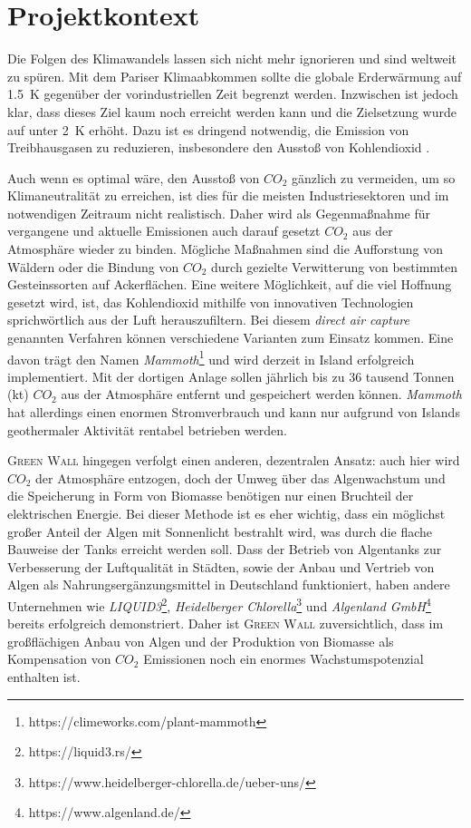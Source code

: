 \section{Projektkontext}

Die Folgen des Klimawandels lassen sich nicht mehr ignorieren und sind weltweit zu spüren. Mit dem Pariser Klimaabkommen sollte die globale Erderwärmung auf \qty{1,5}{\kelvin} gegenüber der vorindustriellen Zeit begrenzt werden. Inzwischen ist jedoch klar, dass dieses Ziel kaum noch erreicht werden kann und die Zielsetzung wurde auf unter \qty{2}{\kelvin} erhöht. Dazu ist es dringend notwendig, die Emission von Treibhausgasen zu reduzieren, insbesondere den Ausstoß von Kohlendioxid \cite{Online2024.UebereinkommenVonParis}.

Auch wenn es optimal wäre, den Ausstoß von \(CO_2\) gänzlich zu vermeiden, um so Klimaneutralität zu erreichen, ist dies für die meisten Industriesektoren und im notwendigen Zeitraum nicht realistisch.
Daher wird als Gegenmaßnahme für vergangene und aktuelle Emissionen auch darauf gesetzt \(CO_2\) aus der Atmosphäre wieder zu binden.
Mögliche Maßnahmen sind die Aufforstung von Wäldern oder die Bindung von \(CO_2\) durch gezielte Verwitterung von bestimmten Gesteinssorten auf Ackerflächen.
Eine weitere Möglichkeit, auf die viel Hoffnung gesetzt wird, ist, das Kohlendioxid mithilfe von innovativen Technologien sprichwörtlich aus der Luft herauszufiltern.
Bei diesem \textit{direct air capture} genannten Verfahren können verschiedene Varianten zum Einsatz kommen.
Eine davon trägt den Namen \textit{Mammoth}\footnote{https://climeworks.com/plant-mammoth} und wird derzeit in Island erfolgreich implementiert.
Mit der dortigen Anlage sollen jährlich bis zu 36 tausend Tonnen (\unit{\kilo\tonne}) \(CO_2\) aus der Atmosphäre entfernt und gespeichert werden können.
\textit{Mammoth} hat allerdings einen enormen Stromverbrauch und kann nur aufgrund von Islands geothermaler Aktivität rentabel betrieben werden.

\textsc{Green Wall} hingegen verfolgt einen anderen, dezentralen Ansatz: auch hier wird \(CO_2\) der Atmosphäre entzogen, doch der Umweg über das Algenwachstum und die Speicherung in Form von Biomasse benötigen nur einen Bruchteil der elektrischen Energie.
Bei dieser Methode ist es eher wichtig, dass ein möglichst großer Anteil der Algen mit Sonnenlicht bestrahlt wird, was durch die flache Bauweise der Tanks erreicht werden soll.
Dass der Betrieb von Algentanks zur Verbesserung der Luftqualität in Städten, sowie der Anbau und Vertrieb von Algen als Nahrungsergänzungsmittel in Deutschland funktioniert, haben andere Unternehmen wie \textit{LIQUID3}\footnote{https://liquid3.rs/ }, \textit{Heidelberger Chlorella}\footnote{https://www.heidelberger-chlorella.de/ueber-uns/} und \textit{Algenland GmbH}\footnote{https://www.algenland.de/} bereits erfolgreich demonstriert.
Daher ist \textsc{Green Wall} zuversichtlich, dass im großflächigen Anbau von Algen und der Produktion von Biomasse als Kompensation von \(CO_2\) Emissionen noch ein enormes Wachstumspotenzial enthalten ist. 
